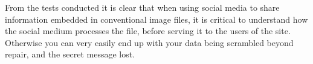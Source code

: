 From the tests conducted it is clear that when using social media to share information embedded in conventional image files, it is critical to understand how the social medium processes the file, before serving it to the users of the site.
Otherwise you can very easily end up with your data being scrambled beyond repair, and the secret message lost.